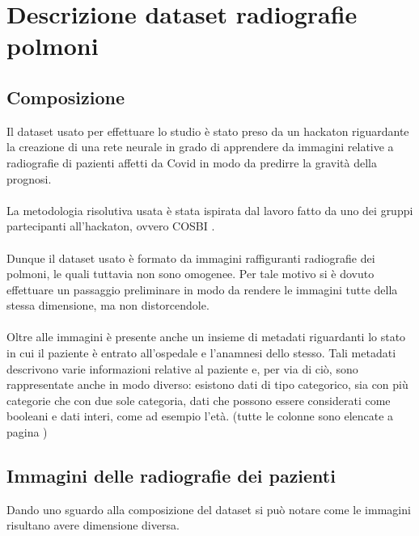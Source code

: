 \chapter{Descrizione dataset radiografie polmoni}
\label{ch:Dataset}
\section{Composizione}
Il dataset usato per effettuare lo studio è stato preso da un hackaton \cite{ai} riguardante la creazione di una rete neurale in grado di apprendere 
da immagini relative a radiografie di pazienti affetti da Covid in modo da predirre la gravità della prognosi.
\\\\
La metodologia risolutiva usata è stata ispirata dal lavoro fatto da uno dei gruppi partecipanti all'hackaton, ovvero COSBI \cite{cch}.
\\\\
Dunque il dataset usato è formato da immagini raffiguranti radiografie dei polmoni, le quali tuttavia non sono omogenee. Per tale motivo 
si è dovuto effettuare un passaggio preliminare in modo da rendere le immagini tutte della stessa dimensione, ma non distorcendole.
\\\\
Oltre alle immagini è presente anche un insieme di metadati riguardanti lo stato in cui il paziente è entrato all'ospedale e l'anamnesi dello stesso.
Tali metadati descrivono varie informazioni relative al paziente e, per via di ciò, sono rappresentate anche in modo diverso: esistono dati di tipo categorico, sia con più categorie che con
due sole categoria, dati che possono essere considerati come booleani e dati interi, come ad esempio l'età.
(tutte le colonne sono elencate a pagina \pageref{eterogeneo})
\clearpage
\section{Immagini delle radiografie dei pazienti}
Dando uno sguardo alla composizione del dataset si può notare come le immagini risultano avere dimensione diversa.

